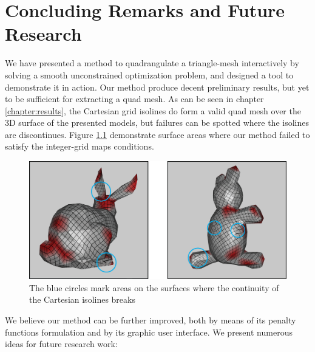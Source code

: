 \chapter{Concluding Remarks and Future Research}
We have presented a method to quadrangulate a triangle-mesh interactively by solving a smooth unconstrained optimization problem, and designed a tool to demonstrate it in action. Our method produce decent preliminary results, but yet to be sufficient for extracting a quad mesh. As can be seen in chapter \ref{chapter:results}, the Cartesian grid isolines do form a valid quad mesh over the 3D surface of the presented models, but failures can be spotted where the isolines are discontinues. Figure \ref{fig:failues} demonstrate surface areas where our method failed to satisfy the integer-grid maps conditions.
\begin{figure}[ht]
\centering
\includegraphics[width=13cm]{figures/results/failures.png}
\caption[Failure Spots of Our Method]{The blue circles mark areas on the surfaces where the continuity of the Cartesian isolines breaks}
\label{fig:failues}
\end{figure}

\noindent We believe our method can be further improved, both by means of its penalty functions formulation and by its graphic user interface. We present numerous ideas for future research work:
